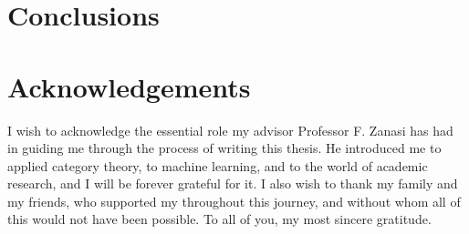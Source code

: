 \documentclass[11pt,a4paper,openright,twoside]{report}
\theoremstyle{plain}
\theoremstyle{definition}
\begin{document}

\chapter*{Conclusions}












{}



\clearpage{\pagestyle{empty}\cleardoublepage}





\chapter*{Acknowledgements}

\thispagestyle{empty}

I wish to acknowledge the essential role my advisor Professor F. Zanasi has had in guiding me through the process of writing this thesis. He introduced me to applied category theory, to machine learning, and to the world of academic research, and I will be forever grateful for it. I also wish to thank my family and my friends, who supported my throughout this journey, and without whom all of this would not have been possible. To all of you, my most sincere gratitude.
\end{document}
